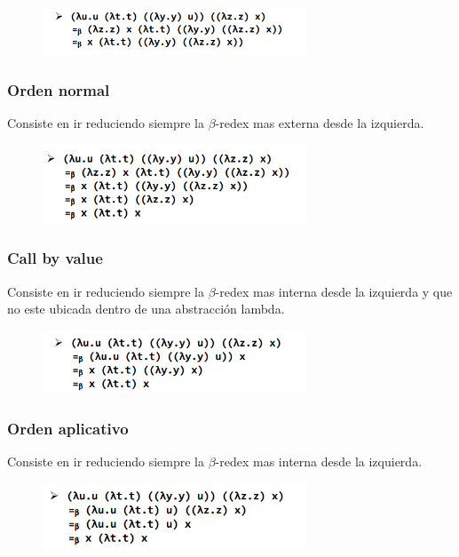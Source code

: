 \begin{figure}[!htb]
    \centering
    \includegraphics[width=0.7\textwidth]{img/CallByNameEjemplo.PNG}
\end{figure}


\subsubsection*{Orden normal}
Consiste en ir reduciendo siempre la $\beta$-redex mas externa desde la izquierda.

\begin{figure}[!htb]
    \centering
    \includegraphics[width=0.7\textwidth]{img/OrdenNormalEj.PNG}
\end{figure}


\subsubsection*{Call by value}
Consiste en ir reduciendo siempre la $\beta$-redex mas interna desde la izquierda y que no este ubicada dentro de una abstracción lambda.

\begin{figure}[!htb]
    \centering
    \includegraphics[width=0.7\textwidth]{img/CallByValueEj.PNG}
\end{figure}


\subsubsection*{Orden aplicativo}
Consiste en ir reduciendo siempre la $\beta$-redex mas interna desde la izquierda.

\begin{figure}[!htb]
    \centering
    \includegraphics[width=0.7\textwidth]{img/OrdenAplicativoEj.PNG}
\end{figure}


